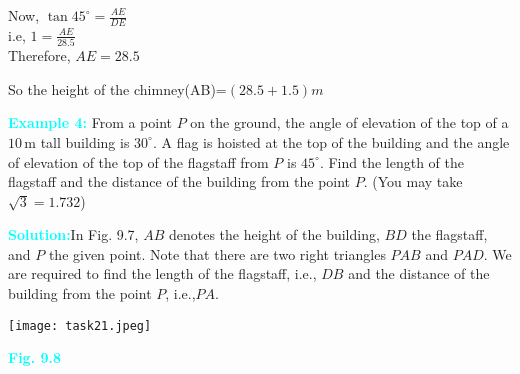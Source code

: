 \documentclass[a4paper,12pt]{article}
\begin{document}
\makeatother
\begin{spacing}{2.5}
\noindent Now,
\hspace{5em}$
\tan 45^\circ = \frac{AE}{DE}$ \\
i.e,
\hspace{7em} $ 1=\frac{AE}{28.5}$ \\
Therefore,
\vspace{-4em}
\hspace{3em} $ AE = 28.5 $ \\
\end{spacing}
\noindent So the height of the chimney(AB)=$(28.5+1.5)m $ \\
\vspace{-0.9em}

\noindent
\textcolor{cyan}{\textbf{Example 4:}}
From a point $P$ on the ground, the angle of elevation of the top of a $10\,\text{m}$ tall building is $30^\circ$. A flag is hoisted at the top of the building and the angle of elevation of the top of the flagstaff from $P$ is $45^\circ$. Find the length of the flagstaff and the distance of the building from the point $P$. (You may take $\sqrt{3} = 1.732$) \\
\vspace{0.15em}

\noindent\textcolor{cyan}{\textbf{Solution:}}In Fig. 9.7, $AB$ denotes the height of the building, $BD$ the flagstaff, and $P$ the given point. Note that there are two right triangles $PAB$ and $PAD$. We are required
to find the length of the flagstaff, i.e., $DB$ and the distance of the building from the
point $P$, i.e.,$PA$.
\hfill
\begin{minipage}[t]{0.5\textwidth}
\vspace{1em}
\texttt{[image: task21.jpeg]}
\begin{center}
\vspace{-0.5em}
\textcolor{cyan}{\textbf{Fig. 9.8}}
\end{center}
\end{minipage}
\end{document}
